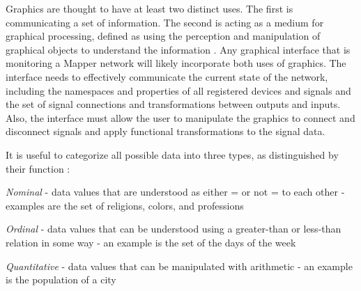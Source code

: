 Graphics are thought to have at least two distinct uses. The first is communicating a set of information. The second is acting as a medium for graphical processing, defined as using the perception and manipulation of graphical objects to understand the information \cite{card1997}. Any graphical interface that is monitoring a Mapper network will likely incorporate both uses of graphics. The interface needs to effectively communicate the current state of the network, including the namespaces and properties of all registered devices and signals and the set of signal connections and transformations between outputs and inputs. Also, the interface must allow the user to manipulate the graphics to connect and disconnect signals and apply functional transformations to the signal data.

It is useful to categorize all possible data into three types, as distinguished by their function \cite{card1997}:
\begin{description}
\item \emph{Nominal} - data values that are understood as either = or not = to each other - examples are the set of religions, colors, and professions
\item \emph{Ordinal} - data values that can be understood using a greater-than or less-than relation in some way - an example is the set of the days of the week
\item \emph{Quantitative} - data values that can be manipulated with arithmetic - an example is the population of a city 
\end{description}

